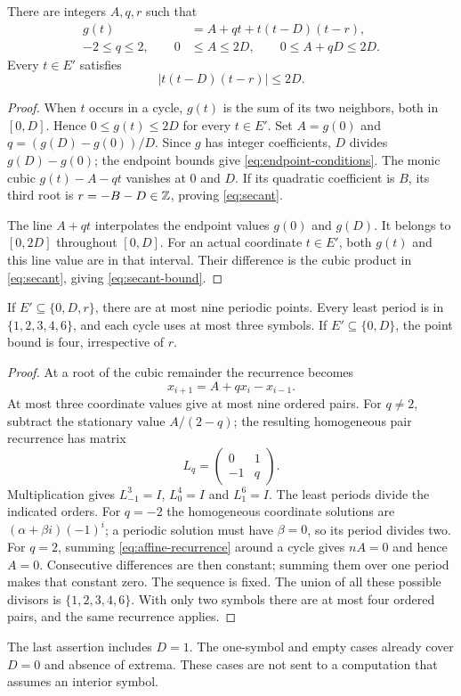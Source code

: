 \begin{lemma}
\label{lem:secant}
There are integers $A,q,r$ such that
\begin{align}
 g(t)&=A+qt+t(t-D)(t-r),\label{eq:secant}\\
 -2\le q\le2,\qquad 0&\le A\le2D,\qquad
 0\le A+qD\le2D.\label{eq:endpoint-conditions}
\end{align}
Every $t\in E'$ satisfies
\begin{equation}
 |t(t-D)(t-r)|\le2D.
 \label{eq:secant-bound}
\end{equation}
\end{lemma}
\begin{proof}
When $t$ occurs in a cycle, $g(t)$ is the sum of its two neighbors,
both in $[0,D]$. Hence $0\le g(t)\le2D$ for every $t\in E'$.
Set $A=g(0)$ and $q=(g(D)-g(0))/D$. Since $g$ has integer
coefficients, $D$ divides $g(D)-g(0)$; the endpoint bounds give
\eqref{eq:endpoint-conditions}. The monic cubic $g(t)-A-qt$
vanishes at $0$ and $D$. If its quadratic coefficient is $B$, its
third root is $r=-B-D\in\mathbb{Z}$, proving \eqref{eq:secant}.

The line $A+qt$ interpolates the endpoint values $g(0)$ and $g(D)$.
It belongs to $[0,2D]$ throughout $[0,D]$. For an actual coordinate
$t\in E'$, both $g(t)$ and this line value are in that interval.
Their difference is the cubic product in \eqref{eq:secant}, giving
\eqref{eq:secant-bound}.
\end{proof}

\begin{lemma}
\label{lem:affine}
If $E'\subseteq\{0,D,r\}$, there are at most nine periodic points.
Every least period is in $\{1,2,3,4,6\}$, and each cycle uses at
most three symbols. If $E'\subseteq\{0,D\}$, the point bound is
four, irrespective of $r$.
\end{lemma}
\begin{proof}
At a root of the cubic remainder the recurrence becomes
\begin{equation}
 x_{i+1}=A+qx_i-x_{i-1}.
 \label{eq:affine-recurrence}
\end{equation}
At most three coordinate values give at most nine ordered pairs.
For $q\ne2$, subtract the stationary value $A/(2-q)$; the resulting
homogeneous pair recurrence has matrix
\[
 L_q=\begin{pmatrix}0&1\\-1&q\end{pmatrix}.
\]
Multiplication gives $L_{-1}^3=I$, $L_0^4=I$ and $L_1^6=I$.
The least periods divide the indicated orders. For $q=-2$ the
homogeneous coordinate solutions are
$(\alpha+\beta i)(-1)^i$; a periodic solution must have
$\beta=0$, so its period divides two. For $q=2$, summing
\eqref{eq:affine-recurrence} around a cycle gives $nA=0$ and hence
$A=0$. Consecutive differences are then constant; summing them over
one period makes that constant zero. The sequence is fixed.
The union of all these possible divisors is $\{1,2,3,4,6\}$.
With only two symbols there are at most four ordered pairs, and the
same recurrence applies.
\end{proof}

The last assertion includes $D=1$. The one-symbol and empty cases
already cover $D=0$ and absence of extrema. These cases are not sent
to a computation that assumes an interior symbol.
